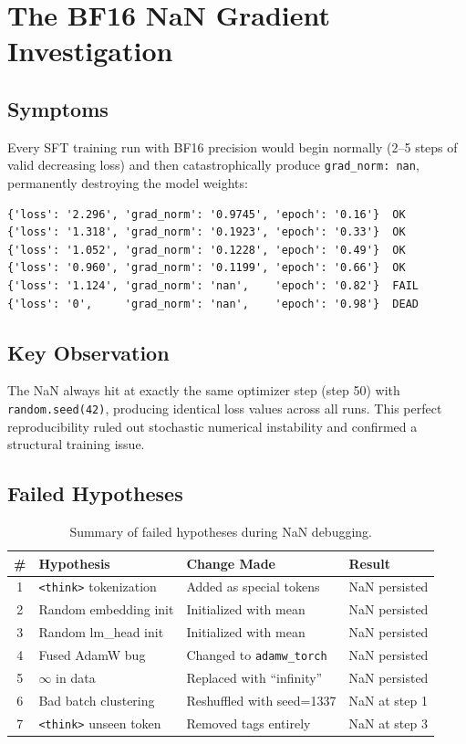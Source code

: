 \documentclass[12pt]{report}
\begin{document}
\section{The BF16 NaN Gradient Investigation}

\subsection{Symptoms}

Every SFT training run with BF16 precision would begin normally (2--5 steps of valid decreasing loss) and then catastrophically produce \texttt{grad\_norm: nan}, permanently destroying the model weights:

\begin{verbatim}
{'loss': '2.296', 'grad_norm': '0.9745', 'epoch': '0.16'}  OK
{'loss': '1.318', 'grad_norm': '0.1923', 'epoch': '0.33'}  OK
{'loss': '1.052', 'grad_norm': '0.1228', 'epoch': '0.49'}  OK
{'loss': '0.960', 'grad_norm': '0.1199', 'epoch': '0.66'}  OK
{'loss': '1.124', 'grad_norm': 'nan',    'epoch': '0.82'}  FAIL
{'loss': '0',     'grad_norm': 'nan',    'epoch': '0.98'}  DEAD
\end{verbatim}

\subsection{Key Observation}

The NaN always hit at exactly the same optimizer step (step 50) with \texttt{random.seed(42)}, producing identical loss values across all runs. This perfect reproducibility ruled out stochastic numerical instability and confirmed a structural training issue.

\subsection{Failed Hypotheses}

\begin{table}[H]
\centering
\caption{Summary of failed hypotheses during NaN debugging.}
\label{tab:nan_hypotheses}
\begin{tabular}{clp{5.5cm}l}
\toprule
\textbf{\#} & \textbf{Hypothesis} & \textbf{Change Made} & \textbf{Result} \\
\midrule
1 & \texttt{<think>} tokenization & Added as special tokens & NaN persisted \\
2 & Random embedding init & Initialized with mean & NaN persisted \\
3 & Random lm\_head init & Initialized with mean & NaN persisted \\
4 & Fused AdamW bug & Changed to \texttt{adamw\_torch} & NaN persisted \\
5 & $\infty$ in data & Replaced with ``infinity'' & NaN persisted \\
6 & Bad batch clustering & Reshuffled with seed=1337 & NaN at step 1 \\
7 & \texttt{<think>} unseen token & Removed tags entirely & NaN at step 3 \\
\bottomrule
\end{tabular}
\end{table}
\end{document}
